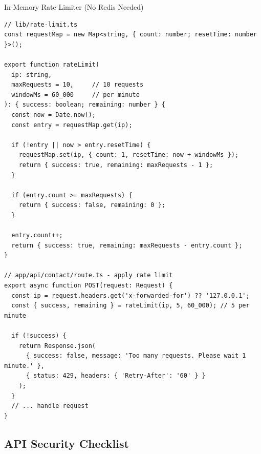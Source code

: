 \documentclass[12pt,a4paper]{article}
\begin{document}
\begin{codebox}{In-Memory Rate Limiter (No Redis Needed)}
\begin{lstlisting}
// lib/rate-limit.ts
const requestMap = new Map<string, { count: number; resetTime: number }>();

export function rateLimit(
  ip: string,
  maxRequests = 10,     // 10 requests
  windowMs = 60_000     // per minute
): { success: boolean; remaining: number } {
  const now = Date.now();
  const entry = requestMap.get(ip);

  if (!entry || now > entry.resetTime) {
    requestMap.set(ip, { count: 1, resetTime: now + windowMs });
    return { success: true, remaining: maxRequests - 1 };
  }

  if (entry.count >= maxRequests) {
    return { success: false, remaining: 0 };
  }

  entry.count++;
  return { success: true, remaining: maxRequests - entry.count };
}

// app/api/contact/route.ts - apply rate limit
export async function POST(request: Request) {
  const ip = request.headers.get('x-forwarded-for') ?? '127.0.0.1';
  const { success, remaining } = rateLimit(ip, 5, 60_000); // 5 per minute

  if (!success) {
    return Response.json(
      { success: false, message: 'Too many requests. Please wait 1 minute.' },
      { status: 429, headers: { 'Retry-After': '60' } }
    );
  }
  // ... handle request
}
\end{lstlisting}
\end{codebox}

\subsection{API Security Checklist}
\end{document}
